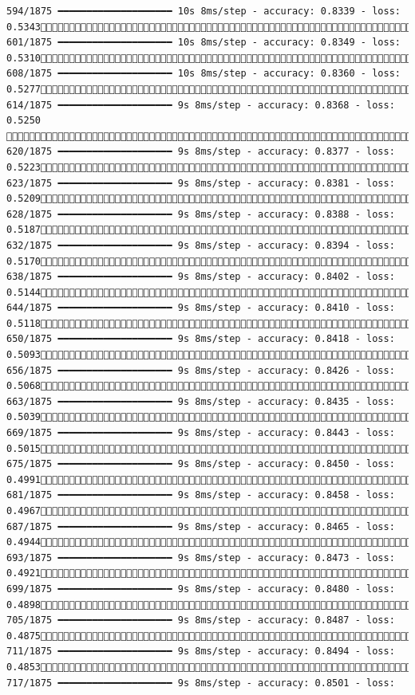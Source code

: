 \documentclass[
  letterpaper,
  DIV=11,
  numbers=noendperiod]{scrreprt}
\begin{document}
\begin{verbatim}
594/1875 ━━━━━━━━━━━━━━━━━━━━ 10s 8ms/step - accuracy: 0.8339 - loss: 0.5343 601/1875 ━━━━━━━━━━━━━━━━━━━━ 10s 8ms/step - accuracy: 0.8349 - loss: 0.5310 608/1875 ━━━━━━━━━━━━━━━━━━━━ 10s 8ms/step - accuracy: 0.8360 - loss: 0.5277 614/1875 ━━━━━━━━━━━━━━━━━━━━ 9s 8ms/step - accuracy: 0.8368 - loss: 0.5250  620/1875 ━━━━━━━━━━━━━━━━━━━━ 9s 8ms/step - accuracy: 0.8377 - loss: 0.5223 623/1875 ━━━━━━━━━━━━━━━━━━━━ 9s 8ms/step - accuracy: 0.8381 - loss: 0.5209 628/1875 ━━━━━━━━━━━━━━━━━━━━ 9s 8ms/step - accuracy: 0.8388 - loss: 0.5187 632/1875 ━━━━━━━━━━━━━━━━━━━━ 9s 8ms/step - accuracy: 0.8394 - loss: 0.5170 638/1875 ━━━━━━━━━━━━━━━━━━━━ 9s 8ms/step - accuracy: 0.8402 - loss: 0.5144 644/1875 ━━━━━━━━━━━━━━━━━━━━ 9s 8ms/step - accuracy: 0.8410 - loss: 0.5118 650/1875 ━━━━━━━━━━━━━━━━━━━━ 9s 8ms/step - accuracy: 0.8418 - loss: 0.5093 656/1875 ━━━━━━━━━━━━━━━━━━━━ 9s 8ms/step - accuracy: 0.8426 - loss: 0.5068 663/1875 ━━━━━━━━━━━━━━━━━━━━ 9s 8ms/step - accuracy: 0.8435 - loss: 0.5039 669/1875 ━━━━━━━━━━━━━━━━━━━━ 9s 8ms/step - accuracy: 0.8443 - loss: 0.5015 675/1875 ━━━━━━━━━━━━━━━━━━━━ 9s 8ms/step - accuracy: 0.8450 - loss: 0.4991 681/1875 ━━━━━━━━━━━━━━━━━━━━ 9s 8ms/step - accuracy: 0.8458 - loss: 0.4967 687/1875 ━━━━━━━━━━━━━━━━━━━━ 9s 8ms/step - accuracy: 0.8465 - loss: 0.4944 693/1875 ━━━━━━━━━━━━━━━━━━━━ 9s 8ms/step - accuracy: 0.8473 - loss: 0.4921 699/1875 ━━━━━━━━━━━━━━━━━━━━ 9s 8ms/step - accuracy: 0.8480 - loss: 0.4898 705/1875 ━━━━━━━━━━━━━━━━━━━━ 9s 8ms/step - accuracy: 0.8487 - loss: 0.4875 711/1875 ━━━━━━━━━━━━━━━━━━━━ 9s 8ms/step - accuracy: 0.8494 - loss: 0.4853 717/1875 ━━━━━━━━━━━━━━━━━━━━ 9s 8ms/step - accuracy: 0.8501 - loss: 
\end{verbatim}
\end{document}
